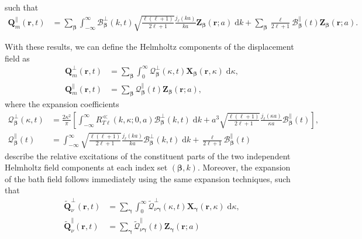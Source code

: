 \documentclass{article}
\begin{document}
such that
\begin{equation}
\begin{split}
\mathbf{Q}_m^\parallel(\mathbf{r},t) &= \sum_{\bm{\beta}}\int_{-\infty}^\infty \mathcal{B}_{\bm{\beta}}^\perp(k,t)\sqrt{\frac{\ell(\ell + 1)}{2\ell + 1}}\frac{j_\ell(ka)}{ka}\mathbf{Z}_{\bm{\beta}}(\mathbf{r};a)\;\mathrm{d}k + \sum_{\bm{\beta}}\frac{\ell}{2\ell + 1}\mathcal{B}_{\bm{\beta}}^\parallel(t)\mathbf{Z}_{\bm{\beta}}(\mathbf{r};a).
\end{split}
\end{equation}

With these results, we can define the Helmholtz components of the displacement field as
\begin{equation}\label{eq:matterFieldHelmholtzExpansion}
\begin{split}
\mathbf{Q}_m^\perp(\mathbf{r},t) &= \sum_{\bm{\beta}}\int_0^\infty \mathcal{Q}_{\bm{\beta}}^\perp(\kappa,t)\mathbf{X}_{\bm{\beta}}(\mathbf{r},\kappa)\;\mathrm{d}\kappa,\\
\mathbf{Q}_m^\parallel(\mathbf{r},t) &= \sum_{\bm{\beta}} \mathcal{Q}_{\bm{\beta}}^\parallel(t)\mathbf{Z}_{\bm{\beta}}(\mathbf{r};a),
\end{split}
\end{equation}
where the expansion coefficients
\begin{equation}
\begin{split}
\mathcal{Q}_{\bm{\beta}}^\perp(\kappa,t) &= \frac{2\kappa^2}{\pi}\left[\int_{-\infty}^\infty R_{T\ell}^\ll(k,\kappa;0,a)\mathcal{B}_{\bm{\beta}}^\perp(k,t)\;\mathrm{d}k + a^3\sqrt{\frac{\ell(\ell + 1)}{2\ell + 1}}\frac{j_\ell(\kappa a)}{\kappa a}\mathcal{B}_{\bm{\beta}}^\parallel(t)\right],\\
\mathcal{Q}_{\bm{\beta}}^\parallel(t) &= \int_{-\infty}^\infty\sqrt{\frac{\ell(\ell + 1)}{2\ell + 1}}\frac{j_\ell(ka)}{ka}\mathcal{B}_{\bm{\beta}}^\perp(k,t)\;\mathrm{d}k + \frac{\ell}{2\ell + 1}\mathcal{B}_{\bm{\beta}}^\parallel(t)
\end{split}
\end{equation}
describe the relative excitations of the constituent parts of the two independent Helmholtz field components at each index set $(\bm{\beta},k)$. Moreover, the expansion of the bath field follows immediately using the same expansion techniques, such that
\begin{equation}\label{eq:bathFieldHelmholtzExpansion}
\begin{split}
\tilde{\mathbf{Q}}_\nu^\perp(\mathbf{r},t) &= \sum_{\bm{\gamma}}\int_0^\infty \tilde{\mathcal{Q}}_{\nu\bm{\gamma}}^\perp(\kappa,t)\mathbf{X}_{\bm{\gamma}}(\mathbf{r},\kappa)\;\mathrm{d}\kappa,\\
\tilde{\mathbf{Q}}_\nu^\parallel(\mathbf{r},t) &= \sum_{\bm{\gamma}}\tilde{\mathcal{Q}}_{\nu\bm{\gamma}}^\parallel(t)\mathbf{Z}_{\bm{\gamma}}(\mathbf{r};a)
\end{split}
\end{equation}
\end{document}
